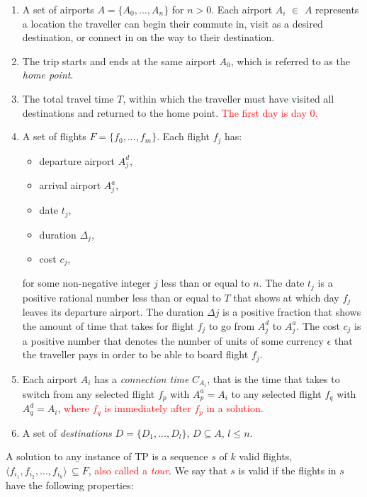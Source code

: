 \documentclass{mprop}
\theoremstyle{definition}
\begin{document}
\begin{enumerate}
\item A set of airports $A = \{ A_{0},...,A_{n} \}$ for $n > 0$. Each airport $A_{i}$ $\in$ $A$ represents a location the traveller can begin their commute in, visit as a desired destination, or connect in on the way to their destination.

\item The trip starts and ends at the same airport $A_{0}$, which is referred to as the \textit{home point}.

\item The total travel time $T$, within which the traveller must have visited all destinations and returned to the home point. \textcolor{red}{The first day is day 0.}
 
\item A set of flights $F = \{ f_{0},...,f_{m} \}$. Each flight $f_{j}$ has:
\begin{itemize}
\item departure airport $A^{d}_{j}$,
\item arrival airport $A^{a}_{j}$,
\item date $t_{j}$,
\item duration $\Delta_{j}$,
\item cost $c_{j}$,
\end{itemize} 
for some non-negative integer $j$ less than or equal to $n$.
The date $t_{j}$ is a positive rational number less than or equal to $T$ that shows at which day $f_{j}$ leaves its departure airport. The duration $\Delta{j}$ is a positive fraction that shows the amount of time that takes for flight $f_{j}$ to go from $A^{d}_{j}$ to $A^{a}_{j}$. The cost $c_{j}$ is a positive number that denotes the number of units of some currency $\epsilon$ that the traveller pays in order to be able to board flight $f_{j}$.

\item Each airport $A_{i}$ has a \textit{connection time} $C_{A_{i}}$, that is the time that takes to switch from any selected flight $f_{p}$ with $A^{a}_{p} = A_{i}$ to any selected flight $f_{q}$ with $A^{d}_{q} = A_{i}$, \textcolor{red}{where $f_{q}$ is immediately after $f_{p}$ in a solution.}

\item A set of \textit{destinations} $D = \{ D_{1},...,D_{l} \}$, $D \subseteq A$, $l \leq n$.
\end{enumerate}

A solution to any instance of TP is a sequence $s$ of $k$ valid flights, $ \langle f_{i_{1}}, f_{i_{2}},...,f_{i_{k}} \rangle \, \subseteq F$, \textcolor{red}{also called a \textit{tour}}. We say that $s$ is valid if the flights in $s$ have the following properties:
\end{document}
